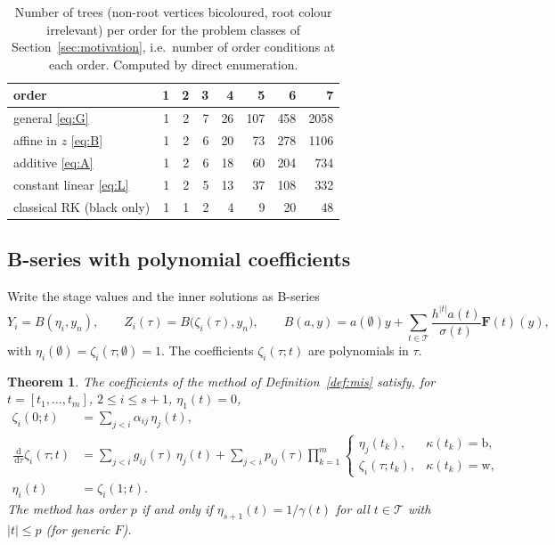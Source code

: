 \documentclass[11pt,a4paper]{article}
\newtheorem{theorem}{Theorem}[section]
\theoremstyle{definition}
\theoremstyle{remark}
\newcommand{\T}{\mathcal{T}}
\newcommand{\dd}{\,\mathrm{d}}
\begin{document}
\begin{table}[ht]
\centering
\caption{Number of trees (non-root vertices bicoloured, root colour
irrelevant) per order for the problem classes of
Section~\ref{sec:motivation}, i.e.\ number of order conditions at
each order. Computed by direct enumeration.}
\label{tab:treecount}
\begin{tabular}{lrrrrrrr}
\toprule
order & 1 & 2 & 3 & 4 & 5 & 6 & 7\\\midrule
general \eqref{eq:G} & 1 & 2 & 7 & 26 & 107 & 458 & 2058\\
affine in $z$ \eqref{eq:B} & 1 & 2 & 6 & 20 & 73 & 278 & 1106\\
additive \eqref{eq:A} & 1 & 2 & 6 & 18 & 60 & 204 & 734\\
constant linear \eqref{eq:L} & 1 & 2 & 5 & 13 & 37 & 108 & 332\\
classical RK (black only) & 1 & 1 & 2 & 4 & 9 & 20 & 48\\
\bottomrule
\end{tabular}
\end{table}

\subsection{B-series with polynomial coefficients}

Write the stage values and the inner solutions as B-series
\begin{equation*}
 Y_i=B(\eta_i,y_n),\qquad Z_i(\tau)=B\big(\zeta_i(\tau),y_n\big),
 \qquad B(a,y)=a(\emptyset)y+\sum_{t\in\T}\frac{h^{|t|}a(t)}{\sigma(t)}\mathbf F(t)(y),
\end{equation*}
with $\eta_i(\emptyset)=\zeta_i(\tau;\emptyset)=1$. The coefficients
$\zeta_i(\tau;t)$ are polynomials in $\tau$.

\begin{theorem}\label{thm:recursion}
The coefficients of the method of Definition~\ref{def:mis} satisfy, for
$t=[t_1,\dots,t_m]$, $2\le i\le s+1$, $\eta_1(t)=0$,
\begin{align*}
 \zeta_i(0;t) &= \sum_{j<i}\alpha_{ij}\,\eta_j(t),\\
 \frac{\dd}{\dd\tau}\zeta_i(\tau;t)
  &= \sum_{j<i}g_{ij}(\tau)\,\eta_j(t)
   + \sum_{j<i}p_{ij}(\tau)\prod_{k=1}^m
     \begin{cases}\eta_j(t_k), & \kappa(t_k)=\mathrm b,\\
                  \zeta_i(\tau;t_k), & \kappa(t_k)=\mathrm w,\end{cases}\\
 \eta_i(t) &= \zeta_i(1;t).
\end{align*}
The method has order $p$ if and only if $\eta_{s+1}(t)=1/\gamma(t)$ for
all $t\in\T$ with $|t|\le p$ (for generic $F$).
\end{theorem}
\end{document}
